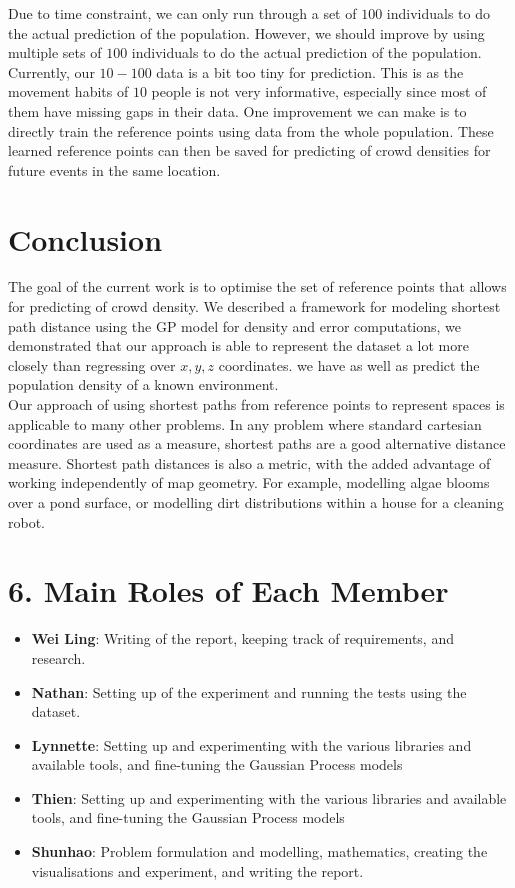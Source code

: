 \documentclass[letterpaper]{article}
\begin{document}
Due to time constraint, we can only run through a set of $100$ individuals to do the actual prediction of the population. However, we should improve by using multiple sets of $100$ individuals to do the actual prediction of the population. \\

Currently, our $10-100$ data is a bit too tiny for prediction. This is as the movement habits of $10$ people is not very informative, especially since most of them have missing gaps in their data. One improvement we can make is to directly train the reference points using data from the whole population. These learned reference points can then be saved for predicting of crowd densities for future events in the same location.

\section{Conclusion}

The goal of the current work is to optimise the set of reference points that allows for predicting of crowd density. We described a framework for modeling shortest path distance using the GP model for density and error computations, we demonstrated that our approach is able to represent the dataset a lot more closely than regressing over $x,y,z$ coordinates. we have as well as predict the population density of a known environment.\\

Our approach of using shortest paths from reference points to represent spaces is applicable to many other problems. In any problem where standard cartesian coordinates are used as a measure, shortest paths are a good alternative distance measure. Shortest path distances is also a metric, with the added advantage of working independently of map geometry. For example, modelling algae blooms over a pond surface, or modelling dirt distributions within a house for a cleaning robot.

\section{6. Main Roles of Each Member}
\begin{itemize}
\item \textbf{Wei Ling}: 
Writing of the report, keeping track of requirements, and research.
\item \textbf{Nathan}: 
Setting up of the experiment and running the tests using the dataset.
\item \textbf{Lynnette}: 
Setting up and experimenting with the various libraries and available tools, and fine-tuning the Gaussian Process models
\item \textbf{Thien}: 
Setting up and experimenting with the various libraries and available tools, and fine-tuning the Gaussian Process models
\item \textbf{Shunhao}: 
Problem formulation and modelling, mathematics, creating the visualisations and experiment, and writing the report.
\end{itemize}



\end{document}
